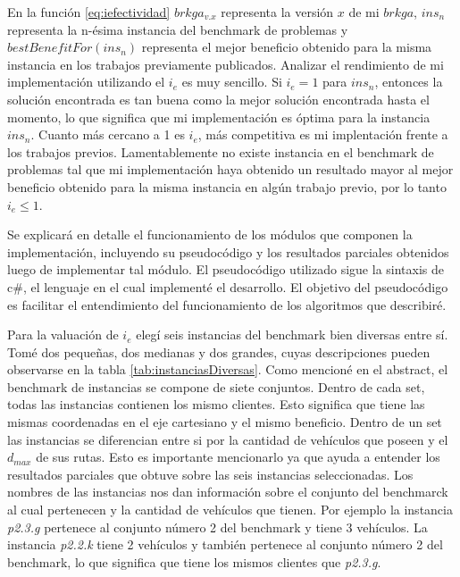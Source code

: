 En la función \eqref{eq:iefectividad} $brkga_{v.x}$ representa la versión $x$ de mi $brkga$, $ins_n$ representa la n-ésima instancia del benchmark de problemas y $bestBenefitFor(ins_n)$ representa el mejor beneficio obtenido para la misma instancia en los trabajos previamente publicados. Analizar el rendimiento de mi implementación utilizando el $i_e$ es muy sencillo. Si $i_e = 1$ para $ins_n$, entonces la solución encontrada es tan buena como la mejor solución encontrada hasta el momento, lo que significa que mi implementación es óptima para la instancia $ins_n$. Cuanto más cercano a 1 es $i_e$, más competitiva es mi implentación frente a los trabajos previos. Lamentablemente no existe instancia en el benchmark de problemas tal que mi implementación haya obtenido un resultado mayor al mejor beneficio obtenido para la misma instancia en algún trabajo previo, por lo tanto $i_e \leq 1$.

\bigskip

Se explicará en detalle el funcionamiento de los módulos que componen la implementación, incluyendo su pseudocódigo y los resultados parciales obtenidos luego de implementar tal módulo. El pseudocódigo utilizado sigue la sintaxis de c\#, el lenguaje en el cual implementé el desarrollo. El objetivo del pseudocódigo es facilitar el entendimiento del funcionamiento de los algoritmos que describiré.


\bigskip

Para la valuación de $i_e$ elegí seis instancias del benchmark bien diversas entre sí. Tomé dos pequeñas, dos medianas y dos grandes, cuyas descripciones pueden observarse en la tabla \ref{tab:instanciasDiversas}. Como mencioné en el abstract, el benchmark de instancias se compone de siete conjuntos. Dentro de cada set, todas las instancias contienen los mismo clientes. Esto significa que tiene las mismas coordenadas en el eje cartesiano y el mismo beneficio. Dentro de un set las instancias se diferencian entre si por la cantidad de vehículos que poseen y el $d_{max}$ de sus rutas. Esto es importante mencionarlo ya que ayuda a entender los resultados parciales que obtuve sobre las seis instancias seleccionadas. Los nombres de las instancias nos dan información sobre el conjunto del benchmarck al cual pertenecen y la cantidad de vehículos que tienen. Por ejemplo la instancia \textit{p2.3.g} pertenece al conjunto número 2 del benchmark y tiene 3 vehículos. La instancia \textit{p2.2.k} tiene 2 vehículos y también pertenece al conjunto número 2 del benchmark, lo que significa que tiene los mismos clientes que \textit{p2.3.g}.

